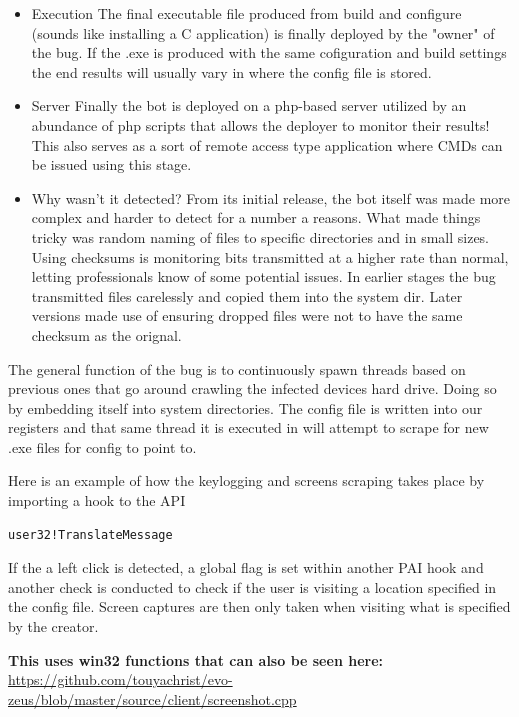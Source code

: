 \documentclass[12pt, letterpaper]{article}
\begin{document}
\begin{sloppypar}
\begin{itemize}
\item
  Execution The final executable file produced from build and configure
  (sounds like installing a C application) is finally deployed by the
  "owner" of the bug. If the .exe is produced with the same cofiguration
  and build settings the end results will usually vary in where the
  config file is stored.
\item
  Server Finally the bot is deployed on a php-based server utilized by
  an abundance of php scripts that allows the deployer to monitor their
  results! This also serves as a sort of remote access type application
  where CMDs can be issued using this stage.
\item
  Why wasn't it detected? From its initial release, the bot itself was
  made more complex and harder to detect for a number a reasons. What
  made things tricky was random naming of files to specific directories
  and in small sizes. Using checksums is monitoring bits transmitted at
  a higher rate than normal, letting professionals know of some
  potential issues. In earlier stages the bug transmitted files
  carelessly and copied them into the system dir. Later versions made
  use of ensuring dropped files were not to have the same checksum as
  the orignal.
\end{itemize}

\noindent The general function of the bug is to continuously spawn threads based
on previous ones that go around crawling the infected devices hard
drive. Doing so by embedding itself into system directories. The config file is 
written into our registers and that same thread it is executed in will attempt 
to scrape for new .exe files for config to point to.

\noindent Here is an example of how the keylogging and screens scraping takes
place by importing a hook to the API

\begin{verbatim}
user32!TranslateMessage
\end{verbatim}

\noindent If the a left click is detected, a global flag is set within another PAI
hook and another check is conducted to check if the user is visiting a
location specified in the config file. Screen captures are then only
taken when visiting what is specified by the creator. 


\noindent \textbf {This uses win32 functions that can also be seen here:} \\
\url{https://github.com/touyachrist/evo-zeus/blob/master/source/client/screenshot.cpp}


\end{sloppypar}
\end{document}
